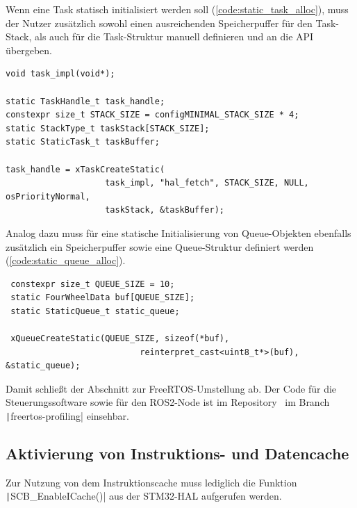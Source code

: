 Wenn eine Task statisch initialisiert werden soll
(\ref{code:static_task_alloc}), muss der Nutzer zusätzlich sowohl einen
ausreichenden Speicherpuffer für den Task-Stack, als auch für die Task-Struktur
manuell definieren und an die API übergeben.

\begin{code}
\begin{verbatim}
void task_impl(void*);

static TaskHandle_t task_handle;
constexpr size_t STACK_SIZE = configMINIMAL_STACK_SIZE * 4;
static StackType_t taskStack[STACK_SIZE];
static StaticTask_t taskBuffer;

task_handle = xTaskCreateStatic(
                    task_impl, "hal_fetch", STACK_SIZE, NULL, osPriorityNormal,
                    taskStack, &taskBuffer);
\end{verbatim}
    \label{code:static_task_alloc}
\end{code}

Analog dazu muss für eine statische Initialisierung von Queue-Objekten ebenfalls
zusätzlich ein Speicherpuffer sowie eine Queue-Struktur definiert werden
(\ref{code:static_queue_alloc}).

\begin{code}
\begin{verbatim}
 constexpr size_t QUEUE_SIZE = 10;
 static FourWheelData buf[QUEUE_SIZE];
 static StaticQueue_t static_queue;

 xQueueCreateStatic(QUEUE_SIZE, sizeof(*buf),
                           reinterpret_cast<uint8_t*>(buf), &static_queue);
\end{verbatim}
    \label{code:static_queue_alloc}
\end{code}

Damit schließt der Abschnitt zur FreeRTOS-Umstellung ab. Der Code für die
Steuerungssoftware sowie für den ROS2-Node ist im
Repository~\cite{mecarover_freertos_profiling} im Branch
\linebreak\texttt|freertos-profiling| einsehbar.

\subsection{Aktivierung von Instruktions- und Datencache}

Zur Nutzung von dem Instruktionscache muss lediglich die Funktion
\texttt|SCB_EnableICache()| aus der STM32-HAL aufgerufen werden.

